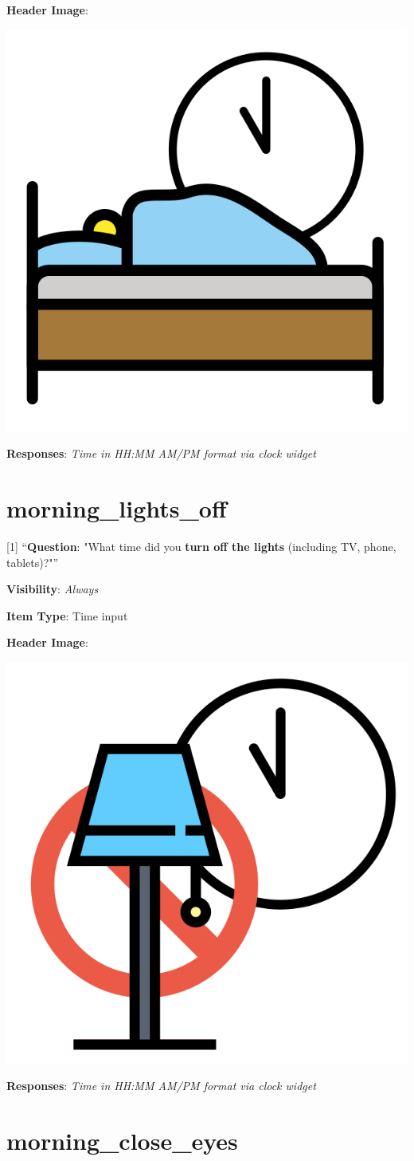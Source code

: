 \documentclass[]{book}
\begin{document}
\textbf{Header Image}:

\begin{flushleft}\includegraphics[width=0.33\linewidth]{downloadFigs4latex_NIMH_Applet_Codebook/morning_bedtime_headerImg} \end{flushleft}

\textbf{Responses}: \emph{Time in HH:MM AM/PM format via clock widget}

\hypertarget{morning_lights_off}{%
\section{morning\_lights\_off}\label{morning_lights_off}}

{[}1{]} ``\textbf{Question}: "What time did you \textbf{turn off the lights} (including TV, phone, tablets)?"''

\textbf{Visibility}: \emph{Always}

\textbf{Item Type}: Time input

\textbf{Header Image}:

\begin{flushleft}\includegraphics[width=0.33\linewidth]{downloadFigs4latex_NIMH_Applet_Codebook/morning_lights_off_headerImg} \end{flushleft}

\textbf{Responses}: \emph{Time in HH:MM AM/PM format via clock widget}

\hypertarget{morning_close_eyes}{%
\section{morning\_close\_eyes}\label{morning_close_eyes}}
\end{document}
